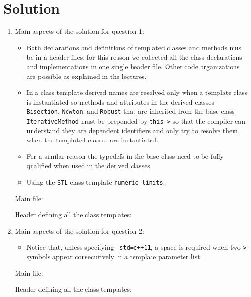 \section*{Solution}

\begin{enumerate}

\item Main aspects of the solution for question 1:

\begin{itemize}

\item Both declarations and definitions of templated classes and methods mus be in a header files, for this reason we collected all the class declarations and implementations in one single header file. Other code organizations are possible as explained in the lectures.

\item In a class template derived names are 
resolved only when a template class is instantiated 
so methods and attributes in the derived classes {\tt Bisection}, {\tt Newton}, and {\tt Robust} that are inherited from the base class {\tt IterativeMethod}
must be prepended by {\tt this->} so that the compiler
can understand they are dependent identifiers and only try to resolve them when the templated classes are instantiated.

\item For a similar reason the typedefs in the base
class need to be fully qualified when used in the derived classes.

\item Using the {\tt STL} class template {\tt numeric\_limits}.

\end{itemize}

Main file:



Header defining all the class templates:


\item Main aspects of the solution for question 2:

\begin{itemize}
\item Notice that, unless specifying {\tt -std=c++11}, a space is required when two {\tt >} 
symbols appear consecutively in a template parameter list.
\end{itemize}

Main file:



Header defining all the class templates:


\end{enumerate}




